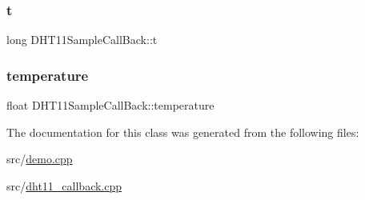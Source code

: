 \subsubsection{\texorpdfstring{t}{t}}
{\footnotesize\ttfamily long D\+H\+T11\+Sample\+Call\+Back\+::t}

\mbox{\label{classDHT11SampleCallBack_a897d17761377313be39c9e974a7df3f4}} 
\subsubsection{\texorpdfstring{temperature}{temperature}}
{\footnotesize\ttfamily float D\+H\+T11\+Sample\+Call\+Back\+::temperature}



The documentation for this class was generated from the following files\+:\begin{DoxyCompactItemize}
\item 
src/\hyperlink{demo_8cpp}{demo.\+cpp}\item 
src/\hyperlink{dht11__callback_8cpp}{dht11\+\_\+callback.\+cpp}\end{DoxyCompactItemize}
